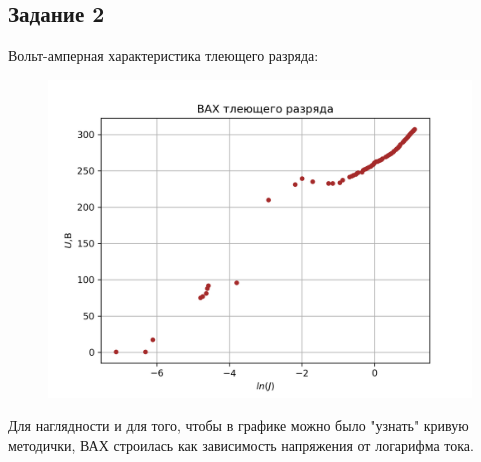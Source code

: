\subsection{Задание 2}
Вольт-амперная характеристика тлеющего разряда:
\begin{figure}[H]
	\centering
	\includegraphics[width=0.75\linewidth]{scripts/z22.png}
	\caption{}
	\label{fig:6}
\end{figure}

Для наглядности и для того, чтобы в графике можно было "узнать" кривую методички, 
ВАХ строилась как зависимость напряжения от логарифма тока. 




